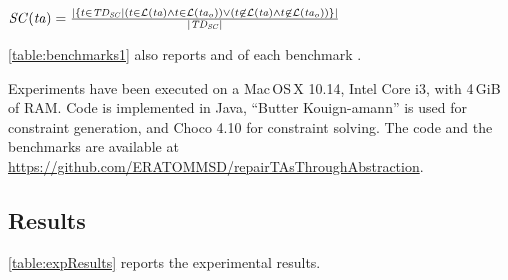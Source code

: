 \begin{tikzborder}{\cite{Gargantini16:validation}}
\begin{tikzborder}{\cite{gargantini_combinatorial_2017}}
\begin{tikzborder}{\cite{garn2019}}
\begin{tikzborder}{\cite{arcaini2019achieving}}
\begin{tikzborder}{\cite{arcaini2019varivolution}}
\begin{tikzborder}{}
\vspace{4pt}
\centerline{$\mathit{SC}(\mathit{ta}) = \frac{|\{t \in \mathit{TD_{SC}} | (t \in \mathcal{L}(\mathit{ta}) \wedge t \in \mathcal{L}(\mathit{ta}_o)) \vee (t \not\in \mathcal{L}(\mathit{ta}) \wedge t \not\in \mathcal{L}(\mathit{ta}_o)) \}|}{|\mathit{TD_{SC}}|}$}
\vspace{4pt}

\bb \ref{table:benchmarks1} also reports \syntDist and \semConf of each benchmark \initTa.

Experiments have been executed on a Mac\,OS\,X 10.14, Intel Core i3, with 4\,GiB of RAM. Code is implemented in Java,  ``Butter Kouign-amann'' is used for constraint generation, and Choco 4.10 for constraint solving. The code and the benchmarks are available at \url{https://github.com/ERATOMMSD/repairTAsThroughAbstraction}.
\be

\subsection{Results}\label{sec:results1}

\bb
\ref{table:expResults} reports the experimental results.
\be


\end{tikzborder}
\end{tikzborder}
\end{tikzborder}
\end{tikzborder}
\end{tikzborder}
\end{tikzborder}
